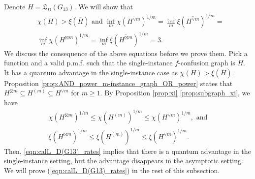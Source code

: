 \documentclass[journal, onecolumn, draftcls]{IEEEtran}
\theoremstyle{definition}
\newcommand{\frL}{\mathfrak{L}}
\begin{document}
Denote $H=\frL_D(G_{13}).$ We will show  that 
\begin{align} 
     &\chi  (H) > \xi(\overline{H}) \text{ and } \inf_m\chi( {H^{\lor m}})^{1/m} = \inf_m \xi(\overline{H^{\lor m}})^{1/m} = \nonumber
     \\& \inf_m\chi( {H^{\boxtimes m}})^{1/m} = \inf_m \xi(\overline{H^{\boxtimes m}})^{1/m} =3. \label{eqn:calL_D(G13)_rates}
\end{align} 
We discuss the consequence of the above equations before we prove them. Pick a function and a valid p.m.f. such that the single-instance $f$-confusion graph is $H$. It has a quantum advantage in the single-instance case as $\chi(H) > \xi(\overline{H})$. Proposition \ref{prop:AND_power_m-instance_graph_OR_power} states that $H^{\boxtimes m}\subseteq H^{(m)}\subseteq H^{\lor m}$ for $m\ge 1$. By Proposition \ref{prop:xi} \ref{prop:subgraph_xi}, we have 
\begin{align*}
   \chi( {H^{\boxtimes m}})^{1/m}  \le \chi( {H^{(m)}})^{1/m} \le  \chi( {H^{\lor m}})^{1/m}, \text{~and}\\
   \xi( \overline{H^{\boxtimes m}})^{1/m}  \le \xi( \overline{H^{(m)}})^{1/m} \le  \xi( \overline{H^{\lor m}})^{1/m}.
\end{align*}
Then,  \eqref{eqn:calL_D(G13)_rates}  implies that there is a quantum advantage in the single-instance setting, but the advantage disappears in the asymptotic setting. We will prove  (\ref{eqn:calL_D(G13)_rates}) in the rest of this subsection.
\end{document}
